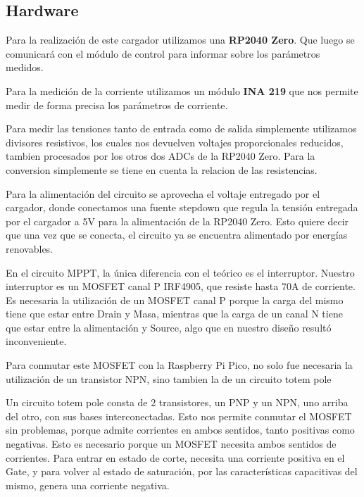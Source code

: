             \subsection{Hardware}
                Para la realización de este cargador utilizamos una \textbf{RP2040 Zero}. Que luego se comunicará con el módulo de control para informar sobre los parámetros medidos.\par
                Para la medición de la corriente utilizamos un módulo \textbf{INA 219} que nos permite medir de forma precisa los parámetros de corriente.\par
                Para medir las tensiones tanto de entrada como de salida simplemente utilizamos divisores resistivos, los cuales nos devuelven voltajes proporcionales reducidos, tambien procesados por los otros dos ADCs de la RP2040 Zero. Para la conversion simplemente se tiene en cuenta la relacion de las resistencias.\par
                Para la alimentación del circuito se aprovecha el voltaje entregado por el cargador, donde conectamos una fuente stepdown que regula la tensión entregada por el cargador a 5V para la alimentación de la RP2040 Zero. Esto quiere decir que una vez que se conecta, el circuito ya se encuentra alimentado por energías renovables.\par
                En el circuito MPPT, la única diferencia con el teórico es el interruptor. Nuestro interruptor es un MOSFET canal P IRF4905, que resiste hasta 70A de corriente. Es necesaria la utilización de un MOSFET canal P porque la carga del mismo tiene que estar entre Drain y Masa, mientras que la carga de un canal N tiene que estar entre la alimentación y Source, algo que en nuestro diseño resultó inconveniente.\par
                Para conmutar este MOSFET con la Raspberry Pi Pico, no solo fue necesaria la utilización de un transistor NPN, sino tambien la de un circuito totem pole\par
                Un circuito totem pole consta de 2 transistores, un PNP y un NPN, uno arriba del otro, con sus bases interconectadas. Esto nos permite conmutar el MOSFET sin problemas, porque admite corrientes en ambos sentidos, tanto positivas como negativas. Esto es necesario porque un MOSFET necesita ambos sentidos de corrientes. Para entrar en estado de corte, necesita una corriente positiva en el Gate, y para volver al estado de saturación, por las características capacitivas del mismo, genera una corriente negativa.\par

